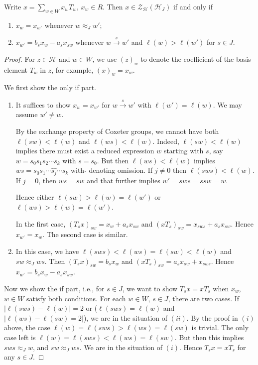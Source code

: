 \documentclass[10pt,a4paper]{amsart}
\def\ch{\mathcal{H}}
\begin{document}
        \begin{prop}\label{prop: diamond}
            Write $x=\sum_{w\in W}x_wT_w$, $x_w\in R$. Then $x\in \mathcal{Z}_{\ch}(\ch_{J})$ if and only if
            \begin{enumerate}
                \item $x_w=x_{w'}$ whenever $w\approx_J w'$;
                \item $x_{w'}=b_sx_w-a_sx_{sw}$ whenever $w\xrightarrow{s} w'$ and $\ell(w)>\ell(w')$ for $s\in J$.
            \end{enumerate}
        \end{prop}

        \begin{proof}
            For $z\in \ch$ and $w\in W$, we use $(z)_w$ to denote the coefficient of the basis element $T_w$ in $z$, for example, $(x)_w=x_w$.

            We first show the only if part.
            \begin{enumerate}
                \item It suffices to show $x_w=x_{w'}$ for $w\xrightarrow{s} w'$ with $\ell(w')=\ell(w)$. We may assume $w'\neq w$.
                
                By the exchange property of Coxeter groups, we cannot have both $\ell(sw)<\ell(w)$ and $\ell(ws)<\ell(w)$. Indeed, $\ell(sw)<\ell(w)$ implies there must exist a reduced expression $w$ starting with $s$, say $w=s_0s_1s_2\cdots s_k$ with $s=s_0$. But then $\ell(ws)<\ell(w)$ implies $ws=s_0s_1\cdots \hat{s_j}\cdots s_k$ with $\hat{}$ denoting omission. If $j\neq 0$ then $\ell(sws)<\ell(w)$. If $j=0$, then $ws=sw$ and that further implies $w'=sws=ssw=w$.
                
                Hence either $\ell(sw)>\ell(w)=\ell(w')$ or $\ell(ws)>\ell(w)=\ell(w')$.

                In the first case, $(T_sx)_{sw}=x_w+a_sx_{sw}$ and $(xT_s)_{sw}=x_{sws}+a_sx_{sw}$. Hence $x_{w'}=x_w$. The second case is similar.

                \item In this case, we have $\ell(sws)<\ell(ws)=\ell(sw)<\ell(w)$ and $sw\approx_J ws$. Then $(T_sx)_{sw}=b_sx_w$ and $(xT_s)_{sw}=a_sx_{sw}+x_{sws}$. Hence $x_{w'}=b_sx_w-a_sx_{sw}$. 
            \end{enumerate}

            Now we show the if part, i.e., for $s\in J$, we want to show $T_sx=xT_s$ when $x_w$, $w\in W$ satisfy both conditions. For each $w\in W$, $s\in J$, there are two cases. If $|\ell(sws)-\ell(w)|=2$ or ($\ell(sws)=\ell(w)$ and $|\ell(ws)-\ell(sw)=2|$), we are in the situation of $(ii)$. By the proof in $(i)$ above, the case $\ell(w)=\ell(sws)>\ell(ws)=\ell(sw)$ is trivial. The only case left is $\ell(w)=\ell(sws)<\ell(ws)=\ell(sw)$. But then this implies $sws\approx_J w$, and $sw\approx_J ws$. We are in the situation of $(i)$. Hence $T_sx=xT_s$ for any $s\in J$.
        \end{proof}
\end{document}
